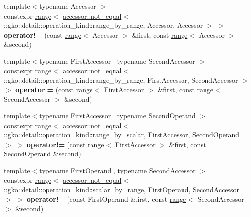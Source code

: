 \begin{DoxyCompactItemize}
\item 
\mbox{\label{namespacegko_a3192cdc0e20795c77068697d2fbb87b3}} 
{\footnotesize template$<$typename Accessor $>$ }\\constexpr \hyperlink{classgko_1_1range}{range}$<$ \hyperlink{structgko_1_1accessor_1_1not__equal}{accessor\+::not\+\_\+equal}$<$ \+::gko\+::detail\+::operation\+\_\+kind\+::range\+\_\+by\+\_\+range, Accessor, Accessor $>$ $>$ {\bfseries operator!=} (const \hyperlink{classgko_1_1range}{range}$<$ Accessor $>$ \&first, const \hyperlink{classgko_1_1range}{range}$<$ Accessor $>$ \&second)
\item 
\mbox{\label{namespacegko_acaba7c56d10cf4ac78abbf1915abc813}} 
{\footnotesize template$<$typename First\+Accessor , typename Second\+Accessor $>$ }\\constexpr \hyperlink{classgko_1_1range}{range}$<$ \hyperlink{structgko_1_1accessor_1_1not__equal}{accessor\+::not\+\_\+equal}$<$ \+::gko\+::detail\+::operation\+\_\+kind\+::range\+\_\+by\+\_\+range, First\+Accessor, Second\+Accessor $>$ $>$ {\bfseries operator!=} (const \hyperlink{classgko_1_1range}{range}$<$ First\+Accessor $>$ \&first, const \hyperlink{classgko_1_1range}{range}$<$ Second\+Accessor $>$ \&second)
\item 
\mbox{\label{namespacegko_a6f677bbc94cc91eb9edf9c55e6f3bec0}} 
{\footnotesize template$<$typename First\+Accessor , typename Second\+Operand $>$ }\\constexpr \hyperlink{classgko_1_1range}{range}$<$ \hyperlink{structgko_1_1accessor_1_1not__equal}{accessor\+::not\+\_\+equal}$<$ \+::gko\+::detail\+::operation\+\_\+kind\+::range\+\_\+by\+\_\+scalar, First\+Accessor, Second\+Operand $>$ $>$ {\bfseries operator!=} (const \hyperlink{classgko_1_1range}{range}$<$ First\+Accessor $>$ \&first, const Second\+Operand \&second)
\item 
\mbox{\label{namespacegko_aca70088d495ea60993e6bf86d155571c}} 
{\footnotesize template$<$typename First\+Operand , typename Second\+Accessor $>$ }\\constexpr \hyperlink{classgko_1_1range}{range}$<$ \hyperlink{structgko_1_1accessor_1_1not__equal}{accessor\+::not\+\_\+equal}$<$ \+::gko\+::detail\+::operation\+\_\+kind\+::scalar\+\_\+by\+\_\+range, First\+Operand, Second\+Accessor $>$ $>$ {\bfseries operator!=} (const First\+Operand \&first, const \hyperlink{classgko_1_1range}{range}$<$ Second\+Accessor $>$ \&second)

\end{DoxyCompactItemize}
